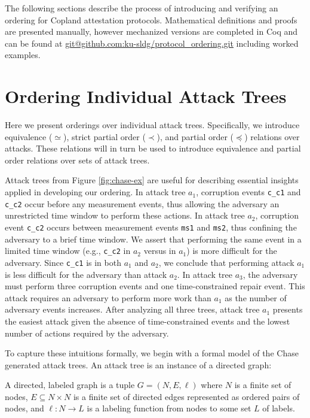\documentclass[runningheads]{llncs}
\theoremstyle{definition}
\begin{document}
The following sections describe the process of introducing and
verifying an ordering for Copland attestation protocols. 
Mathematical definitions and proofs are presented manually, however
mechanized versions are completed in Coq and can be found at
\url{git@github.com:ku-sldg/protocol_ordering.git} including worked
examples. 

\section{Ordering Individual Attack Trees}

Here we present orderings over individual attack trees. Specifically,
we introduce equivalence ($\simeq$), strict partial order ($\prec$),
and partial order ($\preceq$) relations over attacks. These
relations will in turn be used to introduce equivalence and partial
order relations over sets of attack trees.

Attack trees from Figure \ref{fig:chase-ex} are useful for describing
essential insights applied in developing our ordering. In attack tree
$a_1$, corruption events \texttt{c\_c1} and \texttt{c\_c2} occur
before any measurement events, thus allowing the adversary an
unrestricted time window to perform these actions. In
attack tree $a_2$, corruption event \texttt{c\_c2} occurs between
measurement events \texttt{ms1} and \texttt{ms2}, thus confining the
adversary to a brief time window. We
assert that performing the same event in a limited time window (e.g.,
\texttt{c\_c2} in $a_2$ versus in $a_1$) is more difficult for the
adversary. Since \texttt{c\_c1} is in both $a_1$ and $a_2$, we
conclude that performing attack $a_1$ is less difficult for the
adversary than attack $a_2$.  In attack tree $a_3$, the adversary must
perform three corruption events and one time-constrained repair
event. This attack requires an adversary to perform more work than
$a_1$ as the number of adversary events increases. After analyzing all
three trees, attack tree $a_1$ presents the easiest attack given the
absence of time-constrained events and the lowest number of actions
required by the adversary.

To capture these intuitions formally, we begin with a formal model of
the Chase generated attack trees. An attack tree is an instance of a
directed graph:

\begin{definition}
    A directed, labeled graph is a tuple $G = (N, E, \ell)$ where $N$
    is a finite set of nodes, $E \subseteq N \times N$ is a finite set
    of directed edges represented as ordered pairs of nodes, and $\ell
    : N \rightarrow L$ is a labeling function from nodes to some set
    $L$ of labels. 
\end{definition} 
 
\end{document}
